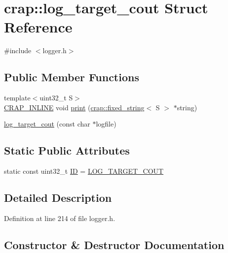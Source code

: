 \hypertarget{structcrap_1_1log__target__cout}{}\section{crap\+:\+:log\+\_\+target\+\_\+cout Struct Reference}
\label{structcrap_1_1log__target__cout}


{\ttfamily \#include $<$logger.\+h$>$}

\subsection*{Public Member Functions}
\begin{DoxyCompactItemize}
\item 
{\footnotesize template$<$uint32\+\_\+t S$>$ }\\\hyperlink{config__x86_8h_a5a40526b8d842e7ff731509998bb0f1c}{C\+R\+A\+P\+\_\+\+I\+N\+L\+I\+N\+E} void \hyperlink{structcrap_1_1log__target__cout_a4b5c8d7fc6b1db6d5f20aabe7b562e8d}{print} (\hyperlink{classcrap_1_1fixed__string}{crap\+::fixed\+\_\+string}$<$ S $>$ $\ast$string)
\item 
\hyperlink{structcrap_1_1log__target__cout_a8ab8eda6c32d64b00f370fff8219af9d}{log\+\_\+target\+\_\+cout} (const char $\ast$logfile)
\end{DoxyCompactItemize}
\subsection*{Static Public Attributes}
\begin{DoxyCompactItemize}
\item 
static const uint32\+\_\+t \hyperlink{structcrap_1_1log__target__cout_a28042ea81a3466c87184a2c6c6cb2b02}{I\+D} = \hyperlink{logger_8h_ade1fdab2d4531d8bdf9b9bf22b96c44f}{L\+O\+G\+\_\+\+T\+A\+R\+G\+E\+T\+\_\+\+C\+O\+U\+T}
\end{DoxyCompactItemize}


\subsection{Detailed Description}


Definition at line 214 of file logger.\+h.



\subsection{Constructor \& Destructor Documentation}
\hypertarget{structcrap_1_1log__target__cout_a8ab8eda6c32d64b00f370fff8219af9d}{}
